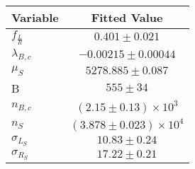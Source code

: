 \begin{tabular}[t]{lc}
\hline
Variable &Fitted Value\\
\hline\hline
$f_{\frac{L}{R}}$&$0.401\pm0.021$\\
\hline
$\lambda_{B,c}$&$-0.00215\pm0.00044$\\
\hline
$\mu_S$&$5278.885\pm0.087$\\
\hline
B&$555\pm34$\\
\hline
$n_{B,c}$&$(2.15\pm0.13)\times 10^3$\\
\hline
$n_S$&$(3.878\pm0.023)\times 10^4$\\
\hline
$\sigma_{L_S}$&$10.83\pm0.24$\\
\hline
$\sigma_{R_S}$&$17.22\pm0.21$\\
\hline
\end{tabular}